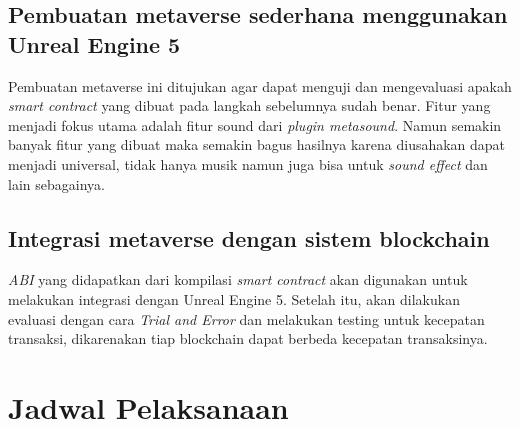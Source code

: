 \subsection{Pembuatan metaverse sederhana menggunakan Unreal Engine 5}
Pembuatan metaverse ini ditujukan agar dapat menguji dan mengevaluasi apakah \emph{smart contract} yang dibuat pada langkah sebelumnya sudah benar.
Fitur yang menjadi fokus utama adalah fitur sound dari \emph{plugin metasound}. Namun semakin banyak fitur yang dibuat maka semakin bagus hasilnya karena
diusahakan dapat menjadi universal, tidak hanya musik namun juga bisa untuk \emph{sound effect} dan lain sebagainya.

\subsection{Integrasi metaverse dengan sistem blockchain}
\emph{ABI} yang didapatkan dari kompilasi \emph{smart contract} akan digunakan untuk melakukan integrasi dengan Unreal Engine 5.
Setelah itu, akan dilakukan evaluasi dengan cara \emph{Trial and Error} dan melakukan testing untuk kecepatan transaksi, dikarenakan
tiap blockchain dapat berbeda kecepatan transaksinya.

\section{Jadwal Pelaksanaan}


